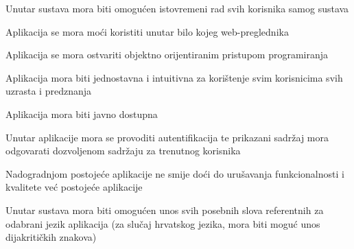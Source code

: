 			  \begin{packed_item}
			 	\item Unutar sustava mora biti omogućen istovremeni rad svih korisnika samog sustava
			 	\item Aplikacija se mora moći koristiti unutar bilo kojeg web-preglednika
			 	\item Aplikacija se mora ostvariti objektno orijentiranim pristupom programiranja
			 	\item Aplikacija mora biti jednostavna i intuitivna za korištenje svim korisnicima svih uzrasta i predznanja
			 	\item Aplikacija mora biti javno dostupna
			 	\item Unutar aplikacije mora se provoditi autentifikacija te prikazani sadržaj mora odgovarati dozvoljenom sadržaju za trenutnog korisnika
			 	\item Nadogradnjom postojeće aplikacije ne smije doći do urušavanja funkcionalnosti i kvalitete već postojeće aplikacije
			 	\item Unutar sustava mora biti omogućen unos svih posebnih slova referentnih za odabrani jezik aplikacija (za slučaj hrvatskog jezika, mora biti moguć unos dijakritičkih znakova)
			 \end{packed_item}



